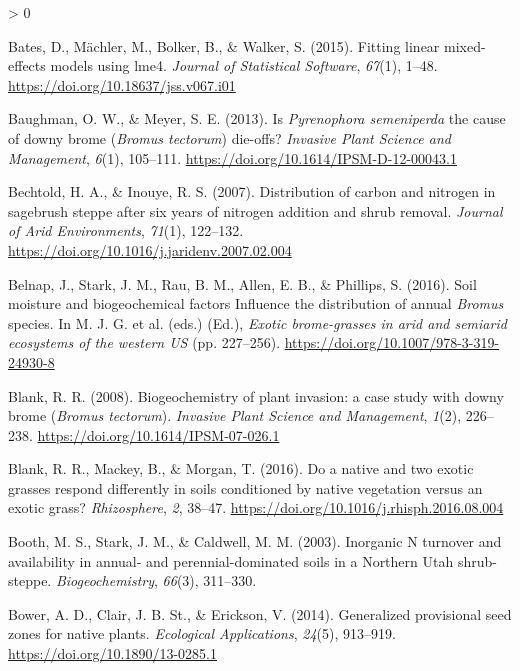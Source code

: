 \documentclass[
  11pt,
  a4paper,
]{article}
\newlength{\cslhangindent}
\newenvironment{CSLReferences}[2] %
 {%
  \setlength{\parindent}{0pt}
  \ifodd #1 \everypar{\setlength{\hangindent}{\cslhangindent}}\ignorespaces\fi
  \ifnum #2 > 0
  \setlength{\parskip}{#2\baselineskip}
  \fi
 }%
 {}
\begin{document}
\begin{CSLReferences}{1}{0}
\leavevmode\hypertarget{ref-Bates2015}{}%
Bates, D., Mächler, M., Bolker, B., \& Walker, S. (2015). Fitting linear mixed-effects models using {lme4}. \emph{Journal of Statistical Software}, \emph{67}(1), 1--48. \url{https://doi.org/10.18637/jss.v067.i01}

\leavevmode\hypertarget{ref-Baughman2013}{}%
Baughman, O. W., \& Meyer, S. E. (2013). {Is \emph{Pyrenophora semeniperda} the cause of downy brome (\emph{Bromus tectorum}) die-offs?} \emph{Invasive Plant Science and Management}, \emph{6}(1), 105--111. \url{https://doi.org/10.1614/IPSM-D-12-00043.1}

\leavevmode\hypertarget{ref-Bechtold2007}{}%
Bechtold, H. A., \& Inouye, R. S. (2007). {Distribution of carbon and nitrogen in sagebrush steppe after six years of nitrogen addition and shrub removal}. \emph{Journal of Arid Environments}, \emph{71}(1), 122--132. \url{https://doi.org/10.1016/j.jaridenv.2007.02.004}

\leavevmode\hypertarget{ref-Belnap2016}{}%
Belnap, J., Stark, J. M., Rau, B. M., Allen, E. B., \& Phillips, S. (2016). {Soil moisture and biogeochemical factors Influence the distribution of annual \emph{Bromus} species}. In M. J. G. et al. (eds.) (Ed.), \emph{Exotic brome-grasses in arid and semiarid ecosystems of the western US} (pp. 227--256). \url{https://doi.org/10.1007/978-3-319-24930-8}

\leavevmode\hypertarget{ref-Blank2008}{}%
Blank, R. R. (2008). {Biogeochemistry of plant invasion: a case study with downy brome (\emph{Bromus tectorum})}. \emph{Invasive Plant Science and Management}, \emph{1}(2), 226--238. \url{https://doi.org/10.1614/IPSM-07-026.1}

\leavevmode\hypertarget{ref-Blank2016}{}%
Blank, R. R., Mackey, B., \& Morgan, T. (2016). {Do a native and two exotic grasses respond differently in soils conditioned by native vegetation versus an exotic grass?} \emph{Rhizosphere}, \emph{2}, 38--47. \url{https://doi.org/10.1016/j.rhisph.2016.08.004}

\leavevmode\hypertarget{ref-Booth2003}{}%
Booth, M. S., Stark, J. M., \& Caldwell, M. M. (2003). {Inorganic N turnover and availability in annual- and perennial-dominated soils in a Northern Utah shrub-steppe}. \emph{Biogeochemistry}, \emph{66}(3), 311--330.

\leavevmode\hypertarget{ref-Bower2014}{}%
Bower, A. D., Clair, J. B. St., \& Erickson, V. (2014). Generalized provisional seed zones for native plants. \emph{Ecological Applications}, \emph{24}(5), 913--919. \url{https://doi.org/10.1890/13-0285.1}


\end{CSLReferences}
\end{document}
